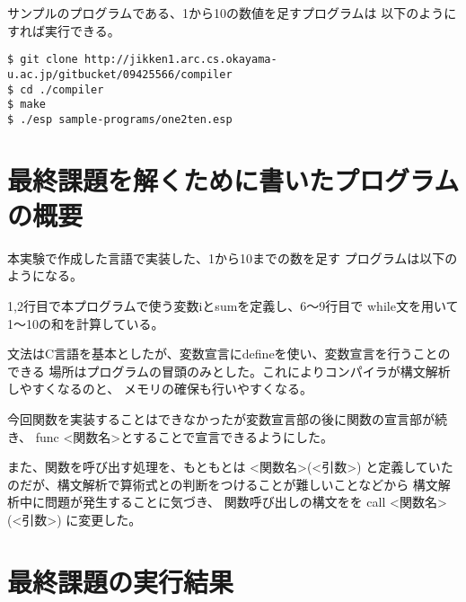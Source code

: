 \documentclass[11pt,a4j]{jarticle}
\begin{document}
サンプルのプログラムである、1から10の数値を足すプログラムは
以下のようにすれば実行できる。

\begin{verbatim}
$ git clone http://jikken1.arc.cs.okayama-u.ac.jp/gitbucket/09425566/compiler
$ cd ./compiler
$ make 
$ ./esp sample-programs/one2ten.esp
\end{verbatim}



\section{最終課題を解くために書いたプログラムの概要}

本実験で作成した言語で実装した、1から10までの数を足す
プログラムは以下のようになる。

\vspace{0.2in}



\vspace{0.2in}

1,2行目で本プログラムで使う変数iとsumを定義し、6〜9行目で
while文を用いて1〜10の和を計算している。


文法はC言語を基本としたが、変数宣言にdefineを使い、変数宣言を行うことのできる
場所はプログラムの冒頭のみとした。これによりコンパイラが構文解析しやすくなるのと、
メモリの確保も行いやすくなる。

\vspace{0.2in}

今回関数を実装することはできなかったが変数宣言部の後に関数の宣言部が続き、
func <関数名>とすることで宣言できるようにした。

また、関数を呼び出す処理を、もともとは <関数名>(<引数>) 
と定義していたのだが、構文解析で算術式との判断をつけることが難しいことなどから
構文解析中に問題が発生することに気づき、
関数呼び出しの構文をを call <関数名>(<引数>) に変更した。



\section{最終課題の実行結果} %
\end{document}

